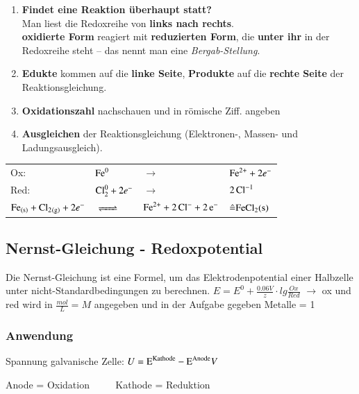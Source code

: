 \begin{enumerate}
	\item \textbf{Findet eine Reaktion überhaupt statt?} \\
	Man liest die Redoxreihe von \textbf{links nach rechts}. \\
	\textbf{oxidierte Form} reagiert mit \textbf{reduzierten Form}, die \textbf{unter ihr} in der Redoxreihe steht – das nennt man eine \textit{Bergab-Stellung}.
	\item \textbf{Edukte} kommen auf die \textbf{linke Seite}, \textbf{Produkte} auf die \textbf{rechte Seite} der Reaktionsgleichung.
	\item \textbf{Oxidationszahl} nachschauen und in römische Ziff. angeben	
	\item \textbf{Ausgleichen} der Reaktionsgleichung (Elektronen-, Massen- und Ladungsausgleich).
\end{enumerate}

\begin{tabular} {l l l l}
	Ox: & $\ce{Fe^0}$ & $\rightarrow$ & $\ce{Fe^{2+}} + 2e^-$ \\
	Red: & $\ce{Cl^{0}2}+ 2e^-$ & $\rightarrow$ & $\ce{2Cl^{-1}}$ \\
	\hline
	$\ce{Fe_{(s)} + Cl2_{(g)}} + 2e^-$& $\ce{<=>}$ & $\ce{Fe^{2+} + 2Cl^- + 2e^-}$ & $\hat{=} \ce{FeCl2_(s)}$ 
\end{tabular}
\subsection{Nernst-Gleichung - Redoxpotential}
Die Nernst-Gleichung ist eine Formel, um das Elektrodenpotential einer Halbzelle unter nicht-Standardbedingungen zu berechnen. \newline
$\boxed{E = E^0+ \frac{0.06V}{z}\cdot lg \frac{Ox}{Red}}$ \newline
$\rightarrow$ ox und red wird in $\frac{mol}{L} = M$ angegeben und in der Aufgabe gegeben \newline
Metalle = 1

\subsubsection{Anwendung}
 Spannung galvanische Zelle: $U = \ce{E^{Kathode}} - \ce{E^{Anode}} V$

Anode = Oxidation $\qquad$ Kathode = Reduktion